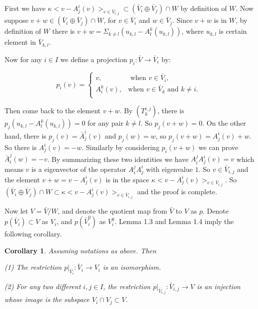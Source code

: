 \def\CTEXPreproc{Created by ctex v0.2.12, don't edit!}\documentclass[11pt]{article}
\newtheorem{cor}{Corollary}[section]
\begin{document}
\begin{pf} First we have $\kappa <v-A^i _j (v) >_{v\in \bar{V}_{i,j} } \subset ( \bar{V}_i \oplus \bar{V}_j ) \cap W$ by definition of $W$.  Now
 suppose $v+w\in ( \bar{V}_i \oplus \bar{V}_j  ) \cap W$, for $v\in \bar{V}_i$ and $w\in \bar{V}_j$. Since $v+w$ is in $W$, by definition of $W$ there is
 $v+w = \Sigma _{k\neq l} ( u_{k,l} - A^k _l (u_{k,l} ) )$, where $u_{k,l}$ is certain element in $ \bar{V}_{k,l}$.

 Now for any $i\in I$ we define a projection $p_i : \bar{V} \rightarrow \bar{V}_i $ by:

 \[
 p_i (v) = \begin{cases}
 v, &\text{ when $v\in \bar{V}_i ,$ }\\
 A^k _i (v), &\text{when $v\in \bar{V}_k $ and $k\neq i$.   }\\

\end{cases}
\]

 Then come back to the element $v+w$. By  $(T^{i,j} _k )$, there is
  $p_j ( u_{k,l} -A^k _l (u_{k,l})   )=0 $ for any pair $k \neq l$.  So  $p_j (v+w)=0 $.  On the other hand, there is
  $p_j (v) = \bar{A}^i _j (v) $ and $ p_j (w) =w $, so  $p_j (v+w) = A^i _j (v) +w $. So there is $A^i _j (v) = -w$. Similarly by considering $p_i (v+w)$ we can prove $\bar{A}^j _i (w)= -v $. By summarizing these two identities we have
   $A^j _i A^i _j (v) =v $ which means $v$ is a eigenvector of the operator $A^j _i A^i _j $ with eigenvalue $1$. So  $v\in \bar{V}_{i,j} $  and the element $v+w=v-A^i _j (v)$ is in the space $\kappa < v-A^i _j (v)   >_{v\in \bar{V}_{i,j}} $. So  $( \bar{V}_i \oplus \bar{V}_j  ) \cap W \subset \kappa < v-A^i _j (v)   >_{v\in \bar{V}_{i,j}}$ and the proof is complete.\\

  \end{pf}
Now let $V= \bar{V}/W$, and denote the quotient map from $\bar{V}$ to $V$ as $p$. Denote $p( \bar{V}_i   )\subset V$ as $ V_i $, and
 $  p( \bar{V}^0 _i  ) $ as $V^0 _i$. Lemma 1.3 and Lemma 1.4 imply the following corollary.

 \begin{cor} Assuming notations as above. Then

\noindent(1) The restriction $p| _{\bar{V}_i } : \bar{V}_i \rightarrow V_i$ is an isomorphism.

\noindent(2) For any two different $i,j\in I$, the restriction $p|_{\bar{V}_{i,j}} : \bar{V}_{i,j}\rightarrow V  $ is an injection whose image is  the subspace $V_i \cap V_j \subset V$.
 \end{cor}
\end{document}
